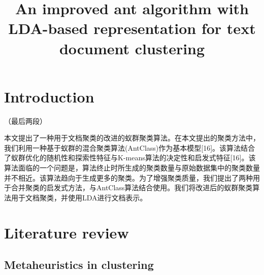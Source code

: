 \documentclass{article}
\begin{document}
\title{An improved ant algorithm with LDA-based representation for text document clustering}
\date{}
\maketitle

\section{Introduction}
（最后两段）\par
本文提出了一种用于文档聚类的改进的蚁群聚类算法。在本文提出的聚类方法中，我们利用一种基于蚁群的混合聚类算法(AntClass)作为基本模型[16]。该算法结合了蚁群优化的随机性和探索性特征与K-means算法的决定性和启发式特征[16]。该算法面临的一个问题是，算法终止时所生成的聚类数量与原始数据集中的聚类数量并不相近。该算法趋向于生成更多的聚类。为了增强聚类质量，我们提出了两种用于合并聚类的启发式方法，与AntClass算法结合使用。我们将改进后的蚁群聚类算法用于文档聚类，并使用LDA进行文档表示。\par

\section{Literature review}

\subsection{Metaheuristics in clustering}
\end{document}
